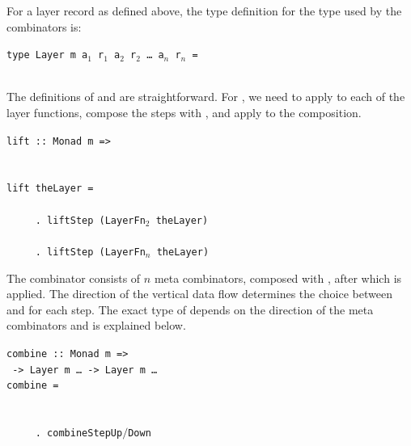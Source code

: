 \documentclass[preprint,natbib]{sigplanconf}
\begin{document}

For a layer record as defined above, the type definition for the  type used by the combinators is:

\begin{small}
\begin{tabbing}
{\tt ty}\={\tt pe Layer m a$_1$ r$_1$ a$_2$ r$_2$ \dots ~a$_n$ r$_n$ =}\\
        \\
\end{tabbing}
\end{small}



The definitions of  and  are straightforward. For , we need to apply  to each of the layer functions, compose the steps with , and apply  to the composition. 

\begin{small}
\begin{tabbing}
{\tt lift}\verb| :: |\={\tt Monad m =>}\\
                     \\
                     \\
{\tt li}\={\tt ft t}\={\tt heLayer = }\\
\\
\>\verb|     . lift|{\tt Step (LayerFn$_2$ theLayer)}\\
\>{\tt ~~~~~\dots}\\ 
\>\verb|     . lift|{\tt Step (LayerFn$_n$ theLayer)}
\end{tabbing}
\end{small}%


The  combinator consists of $n$  meta combinators, composed with , after which  is applied. The direction of the vertical data flow determines the choice between  and  for each step.  The exact type of  depends on the direction of the meta combinators and is explained below. 

\begin{small}
\begin{tabbing}
{\tt combine}\verb| :: |\={\tt Monad m =>}\\
                        \verb| -> |{\tt Layer m \dots}\verb| -> |{\tt Layer m \dots }\\
{\tt co}\={\tt mbine}\={\tt ~= }\\
\\
\>{\tt ~~~~~\dots}\\ 
\>\verb|     . combine|{\tt StepUp$/$Down}\\
\end{tabbing}%
\end{small}
\end{document}
